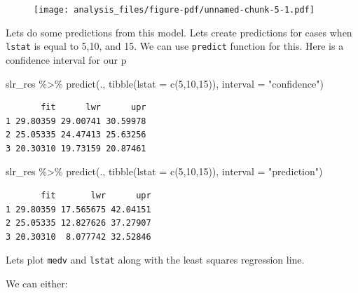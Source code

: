 \documentclass[
  letterpaper,
  DIV=11,
  numbers=noendperiod]{scrreprt}
\newenvironment{Shaded}{\begin{snugshade}}{\end{snugshade}}
\newcommand{\AttributeTok}[1]{\textcolor[rgb]{0.65,0.35,0.00}{#1}}
\newcommand{\DecValTok}[1]{\textcolor[rgb]{0.47,0.16,0.63}{#1}}
\newcommand{\FunctionTok}[1]{\textcolor[rgb]{0.02,0.16,0.49}{#1}}
\newcommand{\NormalTok}[1]{\textcolor[rgb]{0.33,0.33,0.33}{#1}}
\newcommand{\SpecialCharTok}[1]{\textcolor[rgb]{0.00,0.46,0.62}{#1}}
\newcommand{\StringTok}[1]{\textcolor[rgb]{0.00,0.50,0.00}{#1}}
\begin{document}
\begin{figure}[H]

{\centering \texttt{[image: analysis\_files/figure-pdf/unnamed-chunk-5-1.pdf]}

}

\end{figure}

Lets do some predictions from this model. Lets create predictions for
cases when \texttt{lstat} is equal to 5,10, and 15. We can use
\texttt{predict} function for this. Here is a confidence interval for
our p

\begin{Shaded}
\begin{Highlighting}[]
\NormalTok{slr\_res }\SpecialCharTok{\%\textgreater{}\%} 
  \FunctionTok{predict}\NormalTok{(., }\FunctionTok{tibble}\NormalTok{(}\AttributeTok{lstat =} \FunctionTok{c}\NormalTok{(}\DecValTok{5}\NormalTok{,}\DecValTok{10}\NormalTok{,}\DecValTok{15}\NormalTok{)), }\AttributeTok{interval =} \StringTok{"confidence"}\NormalTok{)}
\end{Highlighting}
\end{Shaded}

\begin{verbatim}
       fit      lwr      upr
1 29.80359 29.00741 30.59978
2 25.05335 24.47413 25.63256
3 20.30310 19.73159 20.87461
\end{verbatim}

\begin{Shaded}
\begin{Highlighting}[]
\NormalTok{slr\_res }\SpecialCharTok{\%\textgreater{}\%} 
  \FunctionTok{predict}\NormalTok{(., }\FunctionTok{tibble}\NormalTok{(}\AttributeTok{lstat =} \FunctionTok{c}\NormalTok{(}\DecValTok{5}\NormalTok{,}\DecValTok{10}\NormalTok{,}\DecValTok{15}\NormalTok{)), }\AttributeTok{interval =} \StringTok{"prediction"}\NormalTok{)}
\end{Highlighting}
\end{Shaded}

\begin{verbatim}
       fit       lwr      upr
1 29.80359 17.565675 42.04151
2 25.05335 12.827626 37.27907
3 20.30310  8.077742 32.52846
\end{verbatim}

Lets plot \texttt{medv} and \texttt{lstat} along with the least squares
regression line.

We can either:

\begin{Shaded}
\end{Shaded}
\end{document}
